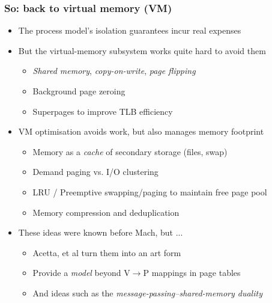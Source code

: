 \begin{frame}
  \frametitle{So: back to virtual memory (VM)}

  \begin{itemize}
    \item The process model's isolation guarantees incur real expenses

    \medskip
    \pause

    \item But the virtual-memory subsystem works quite hard to avoid them
    \begin{itemize}
      \item \textit{Shared memory}, \textit{copy-on-write}, \textit{page
	flipping}
      \item Background page zeroing
      \item Superpages to improve TLB efficiency
    \end{itemize}

    \medskip
    \pause

    \item VM optimisation avoids work, but also manages memory footprint
    \begin{itemize}
      \item Memory as a \textit{cache} of secondary storage (files, swap)
      \item Demand paging vs. I/O clustering
      \item LRU / Preemptive swapping/paging to maintain free page pool
      \item Memory compression and deduplication
    \end{itemize}

    \medskip
    \pause

    \item These ideas were known before Mach, but ...
    \begin{itemize}
      \item Acetta, et al turn them into an art form
      \item Provide a \textit{model} beyond V$\rightarrow$P mappings in page
	tables
      \item And ideas such as the \textit{message-passing--shared-memory
	duality}
    \end{itemize}
  \end{itemize}
\end{frame}

